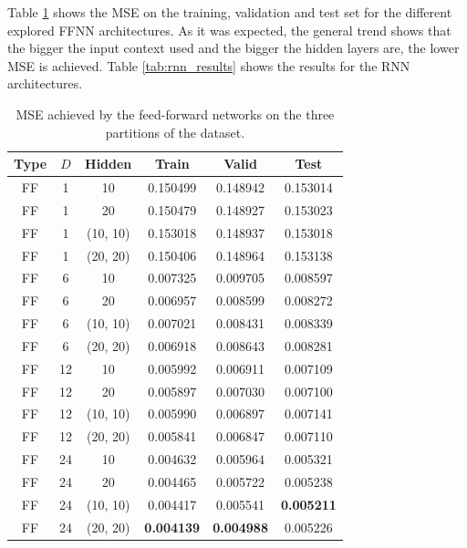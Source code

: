 \documentclass[10pt,a4paper]{article}
\begin{document}
Table \ref{tab:ff_results} shows the MSE on the training, validation and test set for the different explored FFNN architectures. As it was expected, the general trend shows that the bigger the input context used and the bigger the hidden layers are, the lower MSE is achieved. Table \ref{tab:rnn_results} shows the results for the RNN architectures.\\

\begin{table}[h]
\centering
\begin{tabular}{|c|c|c||c|c|c|}
\hline
Type & $D$ & Hidden & Train & Valid & Test\\
\hline
FF & 1 & 10 & 0.150499 & 0.148942 & 0.153014\\
FF & 1 & 20 & 0.150479 & 0.148927 & 0.153023\\
FF & 1 & (10, 10) & 0.153018 & 0.148937 & 0.153018\\
FF & 1 & (20, 20) & 0.150406 & 0.148964 & 0.153138\\
\hline
FF & 6 & 10 & 0.007325 & 0.009705 & 0.008597\\
FF & 6 & 20 & 0.006957 & 0.008599 & 0.008272\\
FF & 6 & (10, 10) & 0.007021 & 0.008431 & 0.008339\\
FF & 6 & (20, 20) & 0.006918 & 0.008643 & 0.008281\\
\hline
FF & 12 & 10 & 0.005992 & 0.006911 & 0.007109\\
FF & 12 & 20 & 0.005897 & 0.007030 & 0.007100 \\
FF & 12 & (10, 10) & 0.005990 & 0.006897 & 0.007141\\
FF & 12 & (20, 20) & 0.005841 & 0.006847 & 0.007110\\
\hline
FF & 24 & 10 & 0.004632 & 0.005964 & 0.005321 \\
FF & 24 & 20 & 0.004465 & 0.005722 & 0.005238 \\
FF & 24 & (10, 10) & 0.004417 & 0.005541 & \textbf{0.005211}\\
FF & 24 & (20, 20) & \textbf{0.004139} & \textbf{0.004988} & 0.005226\\
\hline
\end{tabular}
\caption{MSE achieved by the feed-forward networks on the three partitions of the dataset.}
\label{tab:ff_results}
\end{table}
\end{document}
